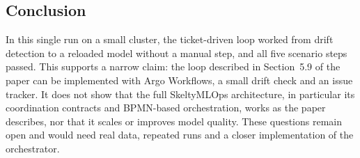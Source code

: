 \subsection{Conclusion}

In this single run on a small cluster, the ticket-driven loop worked from drift detection to a reloaded model without a manual step, and all five scenario steps passed. This supports a narrow claim: the loop described in Section~5.9 of the paper can be implemented with Argo Workflows, a small drift check and an issue tracker. It does not show that the full SkeltyMLOps architecture, in particular its coordination contracts and BPMN-based orchestration, works as the paper describes, nor that it scales or improves model quality. These questions remain open and would need real data, repeated runs and a closer implementation of the orchestrator.
